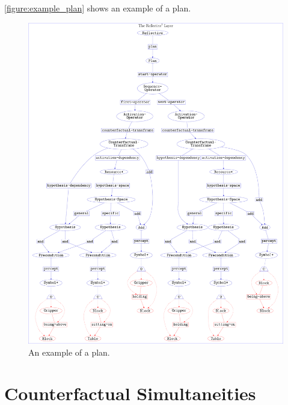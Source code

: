 {\mbox{\autoref{figure:example_plan}}} shows an example of a plan.
\begin{figure}
\hspace*{-4cm}\includegraphics[width=18cm]{gfx/example_plan}
\caption[An example of a plan.]{An example of a plan.}
\label{figure:example_plan}
\end{figure}


\section{Counterfactual Simultaneities}

